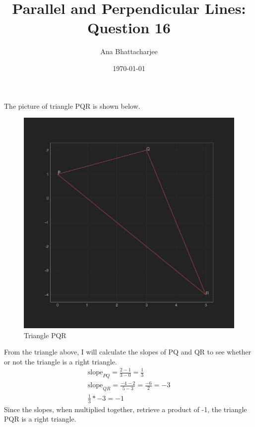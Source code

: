 \documentclass{article}
\begin{document}
\author{Ana Bhattacharjee}
\title{Parallel and Perpendicular Lines: Question 16}
\date{\today}
\maketitle{}

\begin{center}
The picture of triangle PQR is shown below.
\par
\begin{figure}[!htbp]
  \includegraphics[width=1.0\columnwidth]{polygon}
  \caption{Triangle PQR}
\end{figure}
\par
From the triangle above, I will calculate the slopes of PQ and QR to see whether or not the triangle is a right triangle.
\begin{align}
  \text{slope}_{PQ} = \frac{2 - 1}{3 - 0} = \frac{1}{3} \\
  \text{slope}_{QR} = \frac{-4 - 2}{5 - 3} = \frac{-6}{2} = -3 \\
  \frac{1}{3} * -3 = -1
\end{align}
Since the slopes, when multiplied together, retrieve a product of -1, the triangle PQR is a right triangle. 
\end{center}
\end{document}
